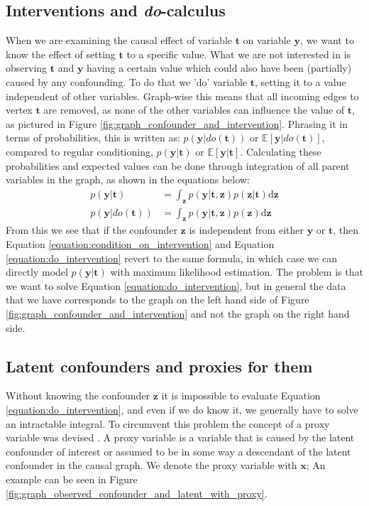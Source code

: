 \documentclass{report}
\newcommand{\E}{\mathbb{E}}
\newcommand{\bt}{\mathbf{t}}
\newcommand{\bx}{\mathbf{x}}
\newcommand{\by}{\mathbf{y}}
\newcommand{\bz}{\mathbf{z}}
\begin{document}
\subsection{Interventions and \textit{do}-calculus}
When we are examining the causal effect of variable $\bt$ on variable $\by$, we want to know the effect of setting $\bt$ to a specific value. What we are not interested in is observing $\bt$ and $\by$ having a certain value which could also have been (partially) caused by any confounding. To do that we 'do' variable $\bt$, setting it to a value independent of other variables. Graph-wise this means that all incoming edges to vertex $\bt$ are removed, as none of the other variables can influence the value of $\bt$, as pictured in Figure \ref{fig:graph_confounder_and_intervention}. Phrasing it in terms of probabilities, this is written as: $p(\by | do(\bt))$ or $\E[\by|do(\bt)]$, compared to regular conditioning, $p(\by|\bt)$ or $\E[\by|\bt]$. Calculating these probabilities and expected values can be done through integration of all parent variables in the graph, as shown in the equations below:
\begin{align}\label{equation:condition_on_intervention}
    p(\by | \bt) &= \int_{\bz} p(\by | \bt, \bz) p(\bz | \bt) \text{d} \bz\\
   p(\by | do(\bt)) &= \int_{\bz} p(\by | \bt, \bz) p(\bz) \text{d} \bz \label{equation:do_intervention}
\end{align}
From this we see that if the confounder $\bz$ is independent from either $\by$ or $\bt$, then Equation \ref{equation:condition_on_intervention} and Equation \ref{equation:do_intervention} revert to the same formula, in which case we can directly model $p(\by|\bt)$ with maximum likelihood estimation. The problem is that we want to solve Equation \ref{equation:do_intervention}, but in general the data that we have corresponds to the graph on the left hand side of Figure \ref{fig:graph_confounder_and_intervention} and not the graph on the right hand side.


\subsection{Latent confounders and proxies for them}
Without knowing the confounder $\bz$ it is impossible to evaluate Equation \ref{equation:do_intervention}, and even if we do know it, we generally have to solve an intractable integral. To circumvent this problem the concept of a proxy variable was devised \parencite{kuroki2014measurement, miao2018identifying}. A proxy variable is a variable that is caused by the latent confounder of interest or assumed to be in some way a descendant of the latent confounder in the causal graph. We denote the proxy variable with $\bx$; An example can be seen in Figure \ref{fig:graph_observed_confounder_and_latent_with_proxy}.
\end{document}
